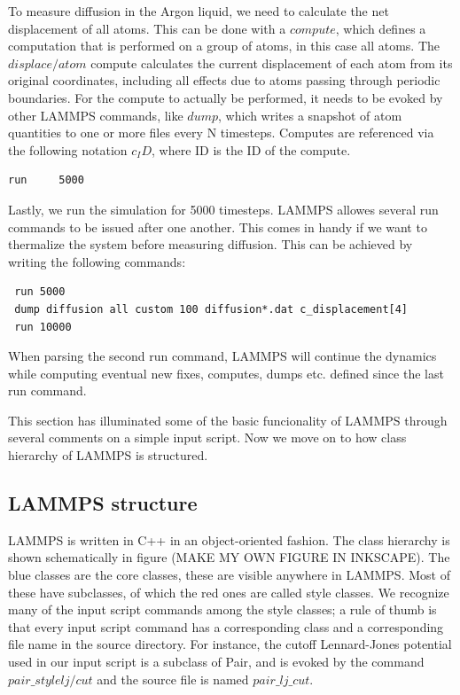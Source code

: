 \documentclass[twoside,english]{uiofysmaster}
\begin{document}
To measure diffusion in the 
Argon liquid, we need to calculate the net
displacement of all atoms. This can be done with a 
$compute$, which defines a computation that is 
performed on a group of atoms, in this case all atoms.
The $displace/atom$ compute calculates the current
displacement of each atom from its original
coordinates, including all effects due to atoms
passing through periodic boundaries.
For the compute to actually be performed, it needs
to be evoked by other LAMMPS commands, like $dump$, 
which writes a snapshot of atom quantities to one 
or more files every N timesteps. Computes are 
referenced via the following notation $c_ID$, where
ID is the ID of the compute. 
\begin{lstlisting}
run		5000
\end{lstlisting}
Lastly, we run the simulation for 5000 timesteps. 
LAMMPS allowes several run commands to be issued
after one another. This comes in handy if we want
to thermalize the system before measuring diffusion.
This can be achieved by writing the following commands:
\begin{lstlisting}
 run 5000
 dump diffusion all custom 100 diffusion*.dat c_displacement[4]
 run 10000
\end{lstlisting}
When parsing the second run command, LAMMPS will
continue the dynamics while computing eventual
new fixes, computes, dumps etc. defined since
the last run command. 

This section has illuminated some of the basic
funcionality of LAMMPS through several comments
on a simple input script. Now we move on to
how class hierarchy of LAMMPS is structured. 

\subsection{LAMMPS structure}
LAMMPS is written in C++ in an object-oriented
fashion. The class hierarchy is shown schematically
in figure (MAKE MY OWN FIGURE IN INKSCAPE). 
The blue classes are the core classes, these
are visible anywhere in LAMMPS.
Most of these have subclasses, of which the red ones
are called style classes. We recognize many 
of the input script commands among the style
classes; a rule of thumb is that every input script
command has a corresponding class and a
corresponding file name in the source directory. 
For instance, the cutoff Lennard-Jones potential
used in our input script is a subclass of Pair,
and is evoked by the command
$pair\_style lj/cut$ and the source file is named
$pair\_lj\_cut$. 
\end{document}
